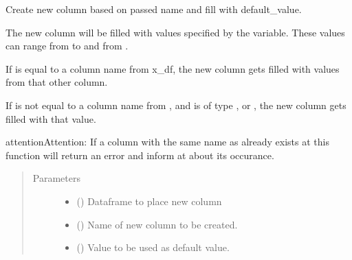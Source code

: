 \documentclass[letterpaper,10pt,english]{sphinxmanual}
\begin{document}
\begin{fulllineitems}
\label{\detokenize{source/optimization.datatools:optimization.datatools.dataprep.create_column}}
Create new column based on passed name and fill with default\_value.

The new column will be filled with values specified by the 
variable. These values can range from  to  and  from .

If  is equal to a column name from x\_df, the new column
gets filled with values from that other column.

If  is not equal to a column name from , and is of type ,
 or , the new column gets filled with that value.

\begin{sphinxadmonition}{attention}{Attention:}
If a column with the same name as  already exists at  this
function will return an error and inform at  about its occurance.
\end{sphinxadmonition}
\begin{quote}\begin{description}
\item[{Parameters}] \leavevmode\begin{itemize}
\item {} 
 () \textendash{} Dataframe to place new column

\item {} 
 () \textendash{} Name of new column to be created.

\item {} 
 () \textendash{} Value to be used as default value.


\end{itemize}
\end{description}
\end{quote}
\end{fulllineitems}
\end{document}
